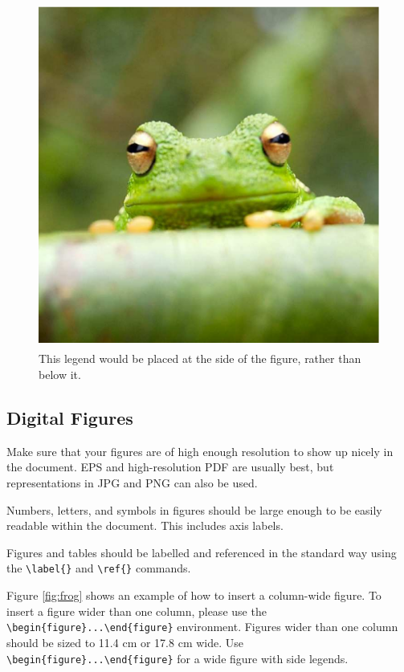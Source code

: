 \documentclass[9pt,twoside]{pnas-new}
\begin{document}
\begin{figure}
\centering
\includegraphics[width=11.4cm,height=11.4cm]{Figures/frog.eps}
\caption{This legend would be placed at the side of the figure, rather than below it.}\label{fig:side}
\end{figure}

\subsection*{Digital Figures}

Make sure that your figures are of high enough resolution to show up nicely in the document. EPS and high-resolution PDF are usually best, but representations in JPG and PNG can also be used.

 Numbers, letters, and symbols in figures should be large enough to be easily readable within the document. This includes axis labels.

Figures and tables should be labelled and referenced in the standard way using the \verb|\label{}| and \verb|\ref{}| commands.

Figure \ref{fig:frog} shows an example of how to insert a column-wide figure. To insert a figure wider than one column, please use the \verb|\begin{figure}...\end{figure}| environment. Figures wider than one column should be sized to 11.4 cm or 17.8 cm wide. Use \verb|\begin{figure}...\end{figure}| for a wide figure with side legends.
\end{document}
